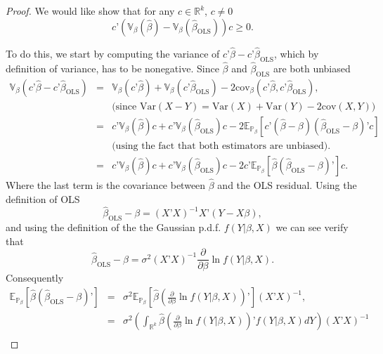 \documentclass[11pt]{article} %
\begin{document}
\begin{proof}
We would like show  that for any $c \in \mathbb{R}^{k}$, $c \neq 0$
\[ c’ \left( \mathbb{V}_{\beta} ( \widehat{\beta} ) - \mathbb{V}_{\beta} (\widehat{\beta}_{\textrm{OLS}}) \right) c \geq 0. \]

To do this, we start by computing the variance of $c’\widehat{\beta} - c’ \widehat{\beta}_{\textrm{OLS}}$, 
which by definition of variance, has to be nonegative. Since $\widehat{\beta}$ and $\widehat{\beta}_{\textrm{OLS}}$ are both unbiased
\begin{eqnarray*}
\mathbb{V}_{\beta} \left( c’\widehat{\beta} - c’ \widehat{\beta}_{\textrm{OLS}} \right)&=&  \mathbb{V}_{\beta} (c’\widehat{\beta}) + \mathbb{V}_{\beta} (c’\widehat{\beta}_{\textrm{OLS}}) - 2 \textrm{cov}_{\beta} ( c’\widehat{\beta} , c’ \widehat{\beta}_{\textrm{OLS}}  ),  \\
&&  \textrm{(since $\textrm{Var}(X-Y) = \textrm{Var}(X) + \textrm{Var}(Y)- 2 \textrm{cov}(X,Y)$)}\\
&=& c’ \mathbb{V}_{\beta}(\widehat{\beta}) c + c’ \mathbb{V}_{\beta}(\widehat{\beta}_{\textrm{OLS}}) c - 2 \mathbb{E}_{\mathbb{P}_{\beta}} \left[  c’ (\widehat{\beta}-\beta) (\widehat{\beta}_{\textrm{OLS}}-\beta)’ c \right] \\
&& \textrm{(using the fact that both estimators are unbiased)}. \\
&=& c’ \mathbb{V}_{\beta}(\widehat{\beta}) c + c’ \mathbb{V}_{\beta}(\widehat{\beta}_{\textrm{OLS}}) c - 2 c’ \mathbb{E}_{\mathbb{P}_{\beta}} \left[  \widehat{\beta} (\widehat{\beta}_{\textrm{OLS}}-\beta)’  \right] c. 
\end{eqnarray*}
Where the last term is the covariance between $\widehat{\beta}$ and the OLS residual. Using the definition of OLS
\[ \widehat{\beta}_{\textrm{OLS}}- \beta = (X’X)^{-1} X’(Y-X\beta),  \]
and using the definition of the the Gaussian p.d.f. $f(Y | \beta,X)$ we can see verify that
\[\widehat{\beta}_{\textrm{OLS}}- \beta =  \sigma^2  (X’X)^{-1} \frac{\partial}{\partial \beta} \ln f(Y | \beta, X ).  \]
Consequently 
\begin{eqnarray*}
\mathbb{E}_{\mathbb{P}_{\beta}} \left[  \widehat{\beta} (\widehat{\beta}_{\textrm{OLS}}-\beta)’  \right] &=& \sigma^2 \mathbb{E}_{\mathbb{P}_{\beta}} \left[  \widehat{\beta} \left( \frac{\partial}{\partial \beta} \ln f(Y | \beta, X )\right)’ \right]  (X’X)^{-1}, \\
&=& \sigma^2 \left( \int_{\mathbb{R}^{k}} \widehat{\beta}  \left( \frac{\partial}{\partial \beta} \ln f(Y | \beta, X )\right)’  f(Y | \beta , X) dY \right) (X’X)^{-1} \\

\end{eqnarray*}
\end{proof}
\end{document}
